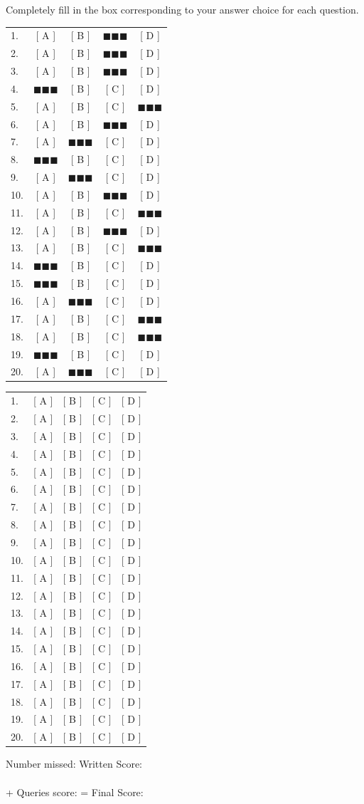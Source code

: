 \documentclass[10pt]{exam}
\def\a{& $\blacksquare\blacksquare\blacksquare$ & [ B ] & [ C ] & [ D ] \\}
\def\b{& [ A ] & $\blacksquare\blacksquare\blacksquare$ & [ C ] & [ D ] \\}
\def\c{& [ A ] & [ B ] & $\blacksquare\blacksquare\blacksquare$ & [ D ] \\}
\def\d{& [ A ] & [ B ] & [ C ] & $\blacksquare\blacksquare\blacksquare$ \\}
\begin{document}
Completely fill in the box corresponding to your answer choice for each question.

\ifprintanswers
\begin{tabular}{lcccc}\\
  1. \c
  2. \c
  3. \c
  4. \a
  5. \d
  6. \c
  7. \b
  8. \a
  9. \b
  10. \c
  11. \d
  12. \c
  13. \d
  14. \a
  15. \a
  16. \b
  17. \d
  18. \d
  19. \a
  20. \b
\end{tabular}
\else
\begin{tabular}{lcccc}\\
  1. & [ A ] & [ B ] & [ C ] & [ D ] \\
  2. & [ A ] & [ B ] & [ C ] & [ D ] \\
  3. & [ A ] & [ B ] & [ C ] & [ D ] \\
  4. & [ A ] & [ B ] & [ C ] & [ D ] \\
  5. & [ A ] & [ B ] & [ C ] & [ D ] \\
  6. & [ A ] & [ B ] & [ C ] & [ D ] \\
  7. & [ A ] & [ B ] & [ C ] & [ D ] \\
  8. & [ A ] & [ B ] & [ C ] & [ D ] \\
  9. & [ A ] & [ B ] & [ C ] & [ D ] \\
  10. & [ A ] & [ B ] & [ C ] & [ D ] \\
  11. & [ A ] & [ B ] & [ C ] & [ D ] \\
  12. & [ A ] & [ B ] & [ C ] & [ D ] \\
  13. & [ A ] & [ B ] & [ C ] & [ D ] \\
  14. & [ A ] & [ B ] & [ C ] & [ D ] \\
  15. & [ A ] & [ B ] & [ C ] & [ D ] \\
  16. & [ A ] & [ B ] & [ C ] & [ D ] \\
  17. & [ A ] & [ B ] & [ C ] & [ D ] \\
  18. & [ A ] & [ B ] & [ C ] & [ D ] \\
  19. & [ A ] & [ B ] & [ C ] & [ D ] \\
  20. & [ A ] & [ B ] & [ C ] & [ D ] \\
\end{tabular}

\fi

\vspace{.5in}

Number missed: \makebox[.5in]{\hrulefill} Written Score: \makebox[.5in]{\hrulefill}\\\\
+ Queries score: \makebox[.5in]{\hrulefill} = Final Score: \makebox[.5in]{\hrulefill}
\end{document}
